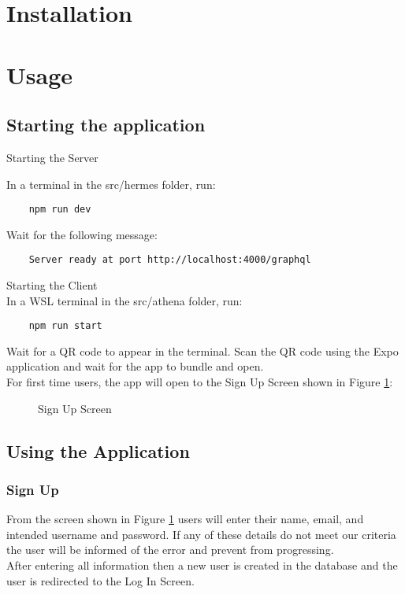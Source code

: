 \documentclass{article}
\begin{document}
\section{Installation}

\section{Usage}

\subsection{Starting the application}

Starting the Server

In a terminal in the src/hermes folder, run:
    \begin{verbatim}
    npm run dev
    \end{verbatim}

Wait for the following message:
    \begin{verbatim}
    Server ready at port http://localhost:4000/graphql
    \end{verbatim}

Starting the Client\\

In a WSL terminal in the src/athena folder, run:
    \begin{verbatim}
    npm run start
    \end{verbatim}

Wait for a QR code to appear in the terminal. Scan the QR code using the Expo application and wait for the app to bundle and open.\\
For first time users, the app will open to the Sign Up Screen shown in Figure \ref{Fig1}:
\begin{figure}[H]
    \centering
    \caption{Sign Up Screen}
    \label{Fig1}
    \end{figure}


\subsection{Using the Application}

\subsubsection{Sign Up}

From the screen shown in Figure \ref{Fig1} users will enter their name, email, and intended username and password. If any of these details do not meet our criteria the user will be informed of the error and prevent from progressing.\\
After entering all information then a new user is created in the database and the user is redirected to the Log In Screen.
\end{document}
